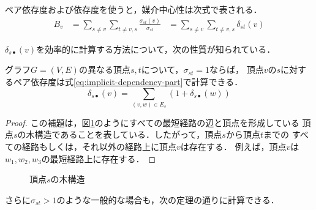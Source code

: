 ペア依存度および依存度を使うと，媒介中心性は次式で表される．
\begin{equation*}
  \begin{aligned}
    B_v&=\sum_{s\neq v}\sum_{t\neq v,s}\frac{\sigma_{st}(v)}{\sigma_{st}}
    &=\sum_{s\neq v}\sum_{t\neq v,s}\delta_{st}(v)
  \end{aligned}
\end{equation*}

$\delta_{s\bullet}(v)$を効率的に計算する方法について，次の性質が知られている．

\begin{lemma}
  \label{lemma:implicit-dependency-part}
  グラフ$G=(V,E)$の異なる頂点$s,t$について，$\sigma_{st}=1$ならば，
  頂点$v$の$s$に対するペア依存度は式\eqref{eq:implicit-dependency-part}で計算できる．
  \begin{equation}
    \label{eq:implicit-dependency-part}
    \delta_{s\bullet}(v)=\sum_{(v,w)\in E_s}(1+\delta_{s\bullet}(w))
  \end{equation}
\end{lemma}
\begin{proof}
  この補題は，図\ref{fig:implicit-dependency-1}のようにすべての最短経路の辺と頂点を形成している
  頂点$s$の木構造であることを表している．したがって，頂点$s$から頂点$t$までの
  すべての経路もしくは，それ以外の経路上に頂点$v$は存在する．
  例えば，頂点$v$は$w_1,w_2,w_3$の最短経路上に存在する．
\end{proof}

\begin{figure}[tb]
  \centering
  \def\svgwidth{.35\linewidth}
  
  \caption{頂点$s$の木構造}
  \label{fig:implicit-dependency-1}
\end{figure}

さらに$\sigma_{st}>1$のような一般的な場合も，次の定理の通りに計算できる．

